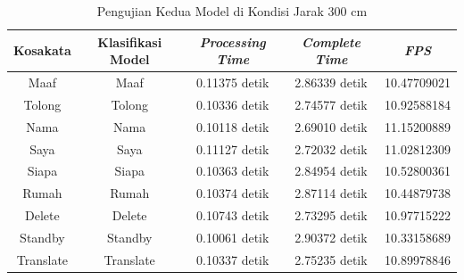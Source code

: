 \begin{longtable}{|c|c|c|c|c|}
  \caption{Pengujian Kedua Model di Kondisi Jarak 300 cm}
  \label{tb:prediksijauh2}                                   \\
  \hline
  \rowcolor[HTML]{C0C0C0}
  \textbf{Kosakata} & \textbf{Klasifikasi Model} & \textbf{\emph{Processing Time}} & \textbf{\emph{Complete Time}} & \textbf{\emph{FPS}}\\
  \hline
  Maaf              & Maaf                          & 0.11375 detik                           & 2.86339 detik                                  & 10.47709021\\
  Tolong            & Tolong                        & 0.10336 detik                           & 2.74577 detik                                  & 10.92588184\\
  Nama              & Nama                          & 0.10118 detik                           & 2.69010 detik                                  & 11.15200889\\
  Saya              & Saya                          & 0.11127 detik                           & 2.72032 detik                                  & 11.02812309\\
  Siapa             & Siapa                         & 0.10363 detik                           & 2.84954 detik                                  & 10.52800361\\
  Rumah             & Rumah                         & 0.10374 detik                           & 2.87114 detik                                  & 10.44879738\\
  Delete            & Delete                        & 0.10743 detik                           & 2.73295 detik                                  & 10.97715222\\
  Standby           & Standby                       & 0.10061 detik                           & 2.90372 detik                                  & 10.33158689\\
  Translate         & Translate                     & 0.10337 detik                           & 2.75235 detik                                  & 10.89978846\\
  \hline
\end{longtable}


